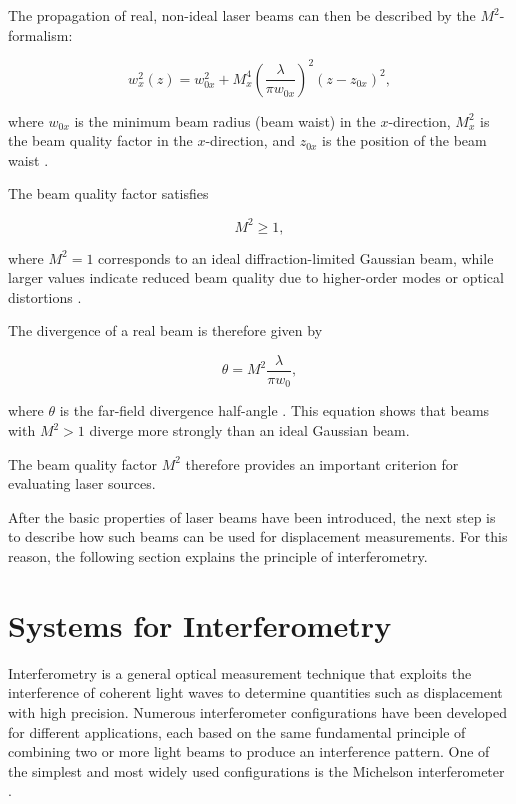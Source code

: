 The propagation of real, non-ideal laser beams can then be described by the \(M^2\)-formalism:

\begin{equation}
w_x^2(z)=w_{0x}^2+
M_x^4\left(\frac{\lambda}{\pi w_{0x}}\right)^2(z-z_{0x})^2,
\end{equation}

where \(w_{0x}\) is the minimum beam radius (beam waist) in the \(x\)-direction, \(M_x^2\) is the beam quality factor in the \(x\)-direction, and \(z_{0x}\) is the position of the beam waist .

The beam quality factor satisfies

\begin{equation}
M^2 \ge 1,
\end{equation}

where \(M^2=1\) corresponds to an ideal diffraction-limited Gaussian beam, while larger values indicate reduced beam quality due to higher-order modes or optical distortions .

The divergence of a real beam is therefore given by

\begin{equation}
\theta = M^2\frac{\lambda}{\pi w_0},
\end{equation}

where \(\theta\) is the far-field divergence half-angle . This equation shows that beams with \(M^2>1\) diverge more strongly than an ideal Gaussian beam.

The beam quality factor \(M^2\) therefore provides an important criterion for evaluating laser sources. 

After the basic properties of laser beams have been introduced, the next step is to describe how such beams can be used for displacement measurements. For this reason, the following section explains the principle of interferometry.

\section{Systems for Interferometry}
Interferometry is a general optical measurement technique that exploits the interference of coherent light waves to determine quantities such as displacement with high precision. Numerous interferometer configurations have been developed for different applications, each based on the same fundamental principle of combining two or more light beams to produce an interference pattern. One of the simplest and most widely used configurations is the Michelson interferometer .

